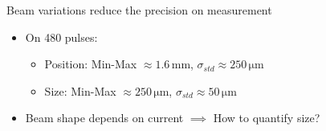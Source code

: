 \begin{frame}[t]
\begin{block}{Beam variations reduce the precision on measurement}
\begin{itemize}
      \item On 480 pulses:
            \begin{itemize}
              \item Position: Min-Max $\approx 1.6\,\mathrm{mm}$, $\sigma_{std} \approx 250\,\mathrm{\mu m}$
              \item Size: Min-Max $\approx 250\,\mathrm{\mu m}$, $\sigma_{std} \approx 50\,\mathrm{\mu m}$
            \end{itemize}
      \item Beam shape depends on current $\implies$ How to quantify size?
    \end{itemize}
  \end{block}
\end{frame}


